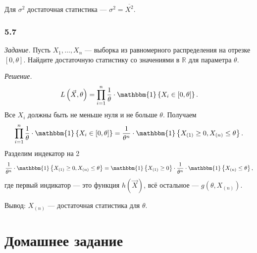 Для $ \sigma^2$ достаточная статистика --- $ \hat{ \sigma^2} = \overline{X^2}$.

\subsubsection{5.7}

\textit{Задание.}
Пусть $X_1, \dotsc, X_n$ ---
выборка из равномерного распределения на отрезке $ \left[ 0, \theta \right] $.
Найдите достаточную статистику со значениями в $ \mathbb{R}$ для параметра $ \theta $.

\textit{Решение.}
$$L \left( \vec{X}, \theta \right) =
  \prod \limits_{i = 1}^n
    \frac{1}{ \theta } \cdot \mathbbm{1} \left\{ X_i \in \left[ 0, \theta \right] \right\}.$$
Все $X_i$ должны быть не меньше нуля и не больше $ \theta $.
Получаем
$$ \prod \limits_{i = 1}^n
    \frac{1}{ \theta } \cdot \mathbbm{1} \left\{ X_i \in \left[ 0, \theta \right] \right\} =
  \frac{1}{ \theta^n} \cdot
  \mathbbm{1} \left\{ X_{ \left( 1 \right) } \geq 0, X_{ \left( n \right) } \leq \theta \right\}.$$
Разделим индекатор на 2
$$ \frac{1}{ \theta^n} \cdot
  \mathbbm{1} \left\{ X_{ \left( 1 \right) } \geq 0, X_{ \left( n \right) } \leq \theta \right\} =
  \mathbbm{1} \left\{ X_{ \left( 1 \right) } \geq 0 \right\} \cdot
  \frac{1}{ \theta^n} \cdot \mathbbm{1} \left\{ X_{ \left( n \right) } \leq \theta \right\},$$
где первый индикатор --- это функция $h \left( \vec{X} \right) $, всё остальное ---
$g \left( \theta, X_{ \left( n \right) } \right) $.

Вывод: $X_{ \left( n \right) }$ --- достаточная статистика для $ \theta $.

\section*{Домашнее задание}
